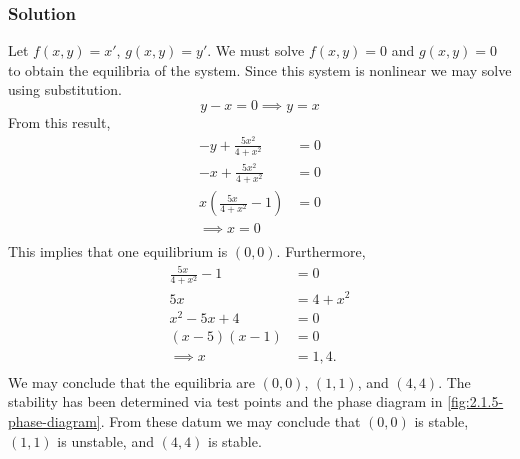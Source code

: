 \documentclass[12pt]{article}
\begin{document}
\subsubsection*{Solution}
Let $f(x,y) = x'$, $g(x,y) = y'$. We must solve $f(x,y)=0$ and $g(x,y)=0$ to
obtain the equilibria of the system. Since this system is nonlinear we may solve
using substitution.
\begin{equation}
  y - x = 0 \implies y = x
\end{equation}
From this result,
\begin{equation}
  \begin{aligned}
    -y+\frac{5x^2}{4+x^2} &= 0 \\
    -x+\frac{5x^2}{4+x^2} &= 0 \\
    x\left(\frac{5x\ }{4+x^2}-1 \right) &= 0 \\
    \implies x = 0 \\
\end{aligned}
\end{equation}
This implies that one equilibrium is $(0,0)$. Furthermore,
\begin{equation}
  \begin{aligned}
    \frac{5x\ }{4+x^2} -1 &= 0 \\
    5x &= 4+x^2 \\
    x^2-5x+4 &= 0 \\
    (x-5)(x-1) &= 0 \\
    \implies x &= 1, 4. \\
  \end{aligned}
\end{equation}
We may conclude that the equilibria are $(0,0)$, $(1,1)$, and $(4,4)$. The
stability has been determined via test points and the phase diagram in
\cref{fig:2.1.5-phase-diagram}. From these datum we may conclude that $(0,0)$ is
stable, $(1,1)$ is unstable, and $(4,4)$ is stable.
\end{document}
